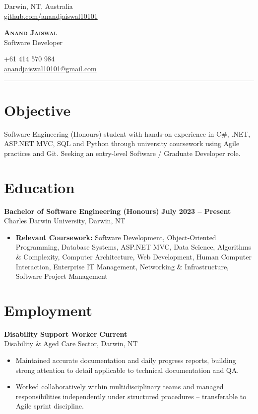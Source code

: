 \documentclass[10.5pt]{article}
\newcommand{\itemlist}[1]{\begin{itemize}[leftmargin=1.4em,itemsep=0pt,topsep=1pt,parsep=0pt]#1\end{itemize}}
\begin{document}
\begin{minipage}[t]{0.33\textwidth}
Darwin, NT, Australia \\
\href{https://github.com/anandjaiswal10101}{github.com/anandjaiswal10101}
\end{minipage}
\hfill
\begin{minipage}[t]{0.34\textwidth}
\centering
{\LARGE \scshape \bfseries Anand Jaiswal}\\[2pt]
{\large Software Developer}
\end{minipage}
\hfill
\begin{minipage}[t]{0.33\textwidth}
\raggedleft
+61 414 570 984 \\
\href{mailto:anandjaiswal10101@gmail.com}{anandjaiswal10101@gmail.com}
\end{minipage}

\vspace{2pt}
\hrule
\vspace{1pt}

\section*{Objective}
Software Engineering (Honours) student with hands-on experience in C\#, .NET, ASP.NET MVC, SQL and Python through university coursework using Agile practices and Git. Seeking an entry-level Software / Graduate Developer role.

\section{Education}
\textbf{Bachelor of Software Engineering (Honours)} \hfill \textbf{July 2023 -- Present} \\
Charles Darwin University, Darwin, NT
\itemlist{
\item \textbf{Relevant Coursework:} Software Development, Object-Oriented Programming, Database Systems, ASP.NET MVC, Data Science, Algorithms \& Complexity, Computer Architecture, Web Development, Human Computer Interaction, Enterprise IT Management, Networking \& Infrastructure, Software Project Management
}

\section{Employment}
\textbf{Disability Support Worker} \hfill \textbf{Current} \\
Disability \& Aged Care Sector, Darwin, NT
\itemlist{
\item Maintained accurate documentation and daily progress reports, building strong attention to detail applicable to technical documentation and QA.
\item Worked collaboratively within multidisciplinary teams and managed responsibilities independently under structured procedures -- transferable to Agile sprint discipline.
}
\end{document}
